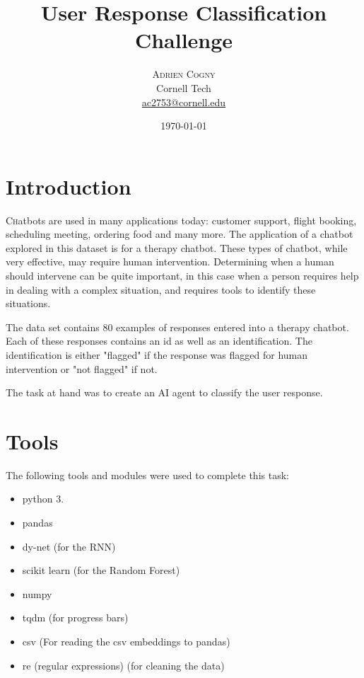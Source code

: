 \documentclass[twoside,twocolumn]{article}
\title{User Response Classification Challenge} %
\author{%
\textsc{Adrien Cogny} \\%
\normalsize Cornell Tech \\ %
\normalsize \href{mailto:ac2753@cornell.edu}{ac2753@cornell.edu} %
}
\date{\today} %
\begin{document}
\maketitle


\section{Introduction}

\lettrine[nindent=0em,lines=3]{C}hatbots are used in many applications today: customer support,
flight booking, scheduling meeting, ordering food and many more. The application of a chatbot
 explored in this dataset is for a therapy chatbot. These types of chatbot, while very effective,
 may require human intervention. Determining when a human should intervene can be quite important,
 in this case when a person requires help in dealing with a complex situation, and requires tools
 to identify these situations. 

The data set contains 80 examples of responses entered into a therapy chatbot. Each of these responses
contains an id as well as an identification. The identification is either "flagged" if the response
was flagged for human intervention or "not flagged" if not.

The task at hand was to create an AI agent to classify the user response. 

\section{Tools}

The following tools and modules were used to complete this task:
\begin{itemize}
\item python 3.
\item pandas
\item dy-net (for the RNN)
\item scikit learn (for the Random Forest)
\item numpy
\item tqdm (for progress bars)
\item csv (For reading the csv embeddings to pandas)
\item re (regular expressions) (for cleaning the data)
\end{itemize}
 
\end{document}
